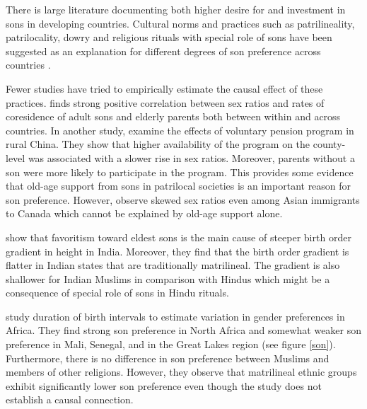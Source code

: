 There is large literature documenting both higher desire for and  investment in sons in  developing countries. Cultural norms and practices such as patrilineality, patrilocality, dowry and religious rituals with special role of sons have been suggested as an explanation for different degrees of son preference across countries  \citep{jayachandran_roots_2015}.

Fewer studies have tried to empirically estimate the causal effect of these practices. \citet{ebenstein_patrilocality_2014} finds strong positive correlation between sex ratios and rates  of coresidence  of adult sons and elderly parents both between within and across countries. 
In another study,  \citet{ebenstein_son_2010} examine the effects of voluntary pension program in rural China. They
show that higher availability of the program on the county-level was associated with a slower rise in sex ratios.  Moreover, parents without a son were more likely to participate in the program. 
This provides some evidence that old-age support from sons in patrilocal societies is an important reason for son preference. 
However, \citet{almond_o_2009} observe skewed sex ratios   even among  Asian immigrants to Canada  which cannot be explained by old-age support alone. 


\citet{jayachandran_why_2017} show that favoritism toward eldest sons is the main cause of steeper birth order gradient in height in India. 
Moreover, they find that the birth order gradient  is flatter in  Indian states that are traditionally matrilineal. The gradient is also shallower for Indian Muslims in comparison with Hindus which might be a consequence of special role of sons in Hindu rituals. 


\citet{rossi_gender_2015} study duration of birth intervals to estimate variation in gender preferences in Africa. They find strong son preference in North Africa and somewhat weaker son preference in Mali, Senegal, and in the Great Lakes region (see figure \ref{son}). Furthermore, there is no difference in son preference between Muslims and members of other religions. However,  they observe that matrilineal ethnic groups exhibit significantly lower son preference even though the study does not establish a causal connection. 